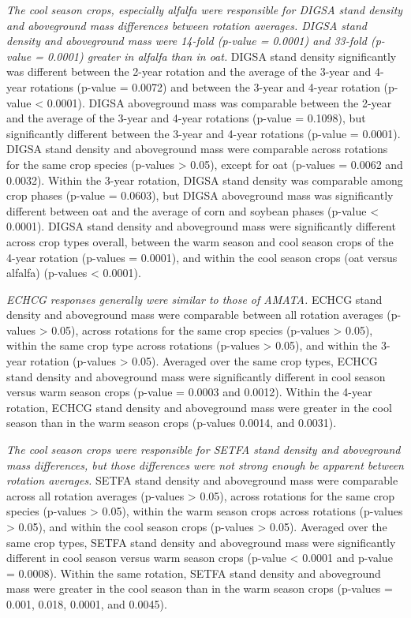 \documentclass[
]{article}
\begin{document}
\emph{The cool season crops, especially alfalfa were responsible for DIGSA stand density and aboveground mass differences between rotation averages. DIGSA stand density and aboveground mass were 14-fold (p-value = 0.0001) and 33-fold (p-value = 0.0001) greater in alfalfa than in oat.} DIGSA stand density significantly was different between the 2-year rotation and the average of the 3-year and 4-year rotations (p-value = 0.0072) and between the 3-year and 4-year rotation (p-value \textless{} 0.0001). DIGSA aboveground mass was comparable between the 2-year and the average of the 3-year and 4-year rotations (p-value = 0.1098), but significantly different between the 3-year and 4-year rotations (p-value = 0.0001). DIGSA stand density and aboveground mass were comparable across rotations for the same crop species (p-values \textgreater{} 0.05), except for oat (p-values = 0.0062 and 0.0032). Within the 3-year rotation, DIGSA stand density was comparable among crop phases (p-value = 0.0603), but DIGSA aboveground mass was significantly different between oat and the average of corn and soybean phases (p-value \textless{} 0.0001). DIGSA stand density and aboveground mass were significantly different across crop types overall, between the warm season and cool season crops of the 4-year rotation (p-values = 0.0001), and within the cool season crops (oat versus alfalfa) (p-values \textless{} 0.0001).

\emph{ECHCG responses generally were similar to those of AMATA.} ECHCG stand density and aboveground mass were comparable between all rotation averages (p-values \textgreater{} 0.05), across rotations for the same crop species (p-values \textgreater{} 0.05), within the same crop type across rotations (p-values \textgreater{} 0.05), and within the 3-year rotation (p-values \textgreater{} 0.05). Averaged over the same crop types, ECHCG stand density and aboveground mass were significantly different in cool season versus warm season crops (p-value = 0.0003 and 0.0012). Within the 4-year rotation, ECHCG stand density and aboveground mass were greater in the cool season than in the warm season crops (p-values 0.0014, and 0.0031).

\emph{The cool season crops were responsible for SETFA stand density and aboveground mass differences, but those differences were not strong enough be apparent between rotation averages.} SETFA stand density and aboveground mass were comparable across all rotation averages (p-values \textgreater{} 0.05), across rotations for the same crop species (p-values \textgreater{} 0.05), within the warm season crops across rotations (p-values \textgreater{} 0.05), and within the cool season crops (p-values \textgreater{} 0.05). Averaged over the same crop types, SETFA stand density and aboveground mass were significantly different in cool season versus warm season crops (p-value \textless{} 0.0001 and p-value = 0.0008). Within the same rotation, SETFA stand density and aboveground mass were greater in the cool season than in the warm season crops (p-values = 0.001, 0.018, 0.0001, and 0.0045).
\end{document}
